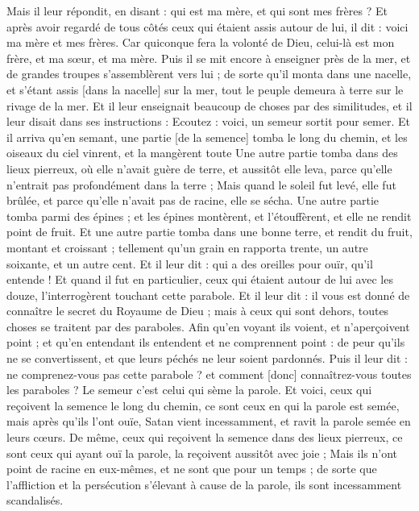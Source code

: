 \begin{multicols}{2}
Mais il leur répondit, en disant : qui est ma mère, et qui sont mes frères ?
Et après avoir regardé de tous côtés ceux qui étaient assis autour de lui, il dit : voici ma mère et mes frères.
Car quiconque fera la volonté de Dieu, celui-là est mon frère, et ma sœur, et ma mère.
\VerseOne{}Puis il se mit encore à enseigner près de la mer, et de grandes troupes s'assemblèrent vers lui ; de sorte qu'il monta dans une nacelle, et s'étant assis [dans la nacelle] sur la mer, tout le peuple demeura à terre sur le rivage de la mer.
Et il leur enseignait beaucoup de choses par des similitudes, et il leur disait dans ses instructions :
Ecoutez : voici, un semeur sortit pour semer.
Et il arriva qu'en semant, une partie [de la semence] tomba le long du chemin, et les oiseaux du ciel vinrent, et la mangèrent toute
Une autre partie tomba dans des lieux pierreux, où elle n'avait guère de terre, et aussitôt elle leva, parce qu'elle n'entrait pas profondément dans la terre ;
Mais quand le soleil fut levé, elle fut brûlée, et parce qu'elle n'avait pas de racine, elle se sécha.
Une autre partie tomba parmi des épines ; et les épines montèrent, et l'étouffèrent, et elle ne rendit point de fruit.
Et une autre partie tomba dans une bonne terre, et rendit du fruit, montant et croissant ; tellement qu'un grain en rapporta trente, un autre soixante, et un autre cent.
Et il leur dit : qui a des oreilles pour ouïr, qu'il entende !
Et quand il fut en particulier, ceux qui étaient autour de lui avec les douze, l'interrogèrent touchant cette parabole.
Et il leur dit : il vous est donné de connaître le secret du Royaume de Dieu ; mais à ceux qui sont dehors, toutes choses se traitent par des paraboles.
Afin qu'en voyant ils voient, et n'aperçoivent point ; et qu'en entendant ils entendent et ne comprennent point : de peur qu'ils ne se convertissent, et que leurs péchés ne leur soient pardonnés.
Puis il leur dit : ne comprenez-vous pas cette parabole ? et comment [donc] connaîtrez-vous toutes les paraboles ?
Le semeur c'est celui qui sème la parole.
Et voici, ceux qui reçoivent la semence le long du chemin, ce sont ceux en qui la parole est semée, mais après qu'ils l'ont ouïe, Satan vient incessamment, et ravit la parole semée en leurs cœurs.
De même, ceux qui reçoivent la semence dans des lieux pierreux, ce sont ceux qui ayant ouï la parole, la reçoivent aussitôt avec joie ;
Mais ils n'ont point de racine en eux-mêmes, et ne sont que pour un temps ; de sorte que l'affliction et la persécution s'élevant à cause de la parole, ils sont incessamment scandalisés.

\end{multicols}
